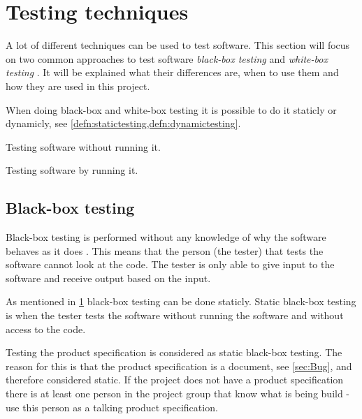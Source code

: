 \section{Testing techniques} \label{sec:testingtechniques}
A lot of different techniques can be used to test software.
This section will focus on two common approaches to test software \textit{black-box testing} and \textit{white-box testing} \cite{SoftwareTesting}.
It will be explained what their differences are, when to use them and how they are used in this project.

When doing black-box and white-box testing it is possible to do it staticly or dynamicly, see \cref{defn:statictesting,defn:dynamictesting}.

\begin{defn} \label{defn:statictesting}
Testing software without running it.
\end{defn}

\begin{defn} \label{defn:dynamictesting}
Testing software by running it.
\end{defn}

\subsection{Black-box testing} \label{sec:blackboxtesting}
Black-box testing is performed without any knowledge of why the software behaves as it does \cite{SoftwareTesting}.
This means that the person (the tester) that tests the software cannot look at the code.
The tester is only able to give input to the software and receive output based on the input.

As mentioned in \cref{sec:testingtechniques} black-box testing can be done staticly.
Static black-box testing is when the tester tests the software without running the software and without access to the code. %

Testing the product specification is considered as static black-box testing.
The reason for this is that the product specification is a document, see \cref{sec:Bug}, and therefore considered static.
If the project does not have a product specification there is at least one person in the project group that know what is being build - use this person as a talking product specification. \cite{SoftwareTesting}

